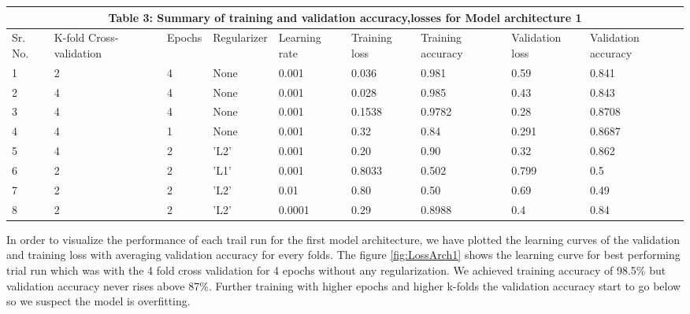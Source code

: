 \documentclass{article}
\begin{document}
\begin{tabular}{ |p{0.5cm}||p{1.4cm}||p{1cm}||p{1.6cm}||p{1.25cm}||p{1.2cm}||p{1.4cm}||p{1.55cm}||p{1.5cm}|}
\hline
 \multicolumn{9}{|c|}{Table 3: Summary of training and validation accuracy,losses for Model architecture 1 } \\
 \hline
 Sr. No. & K-fold Cross-validation & Epochs & Regularizer & Learning rate & Training loss & Training accuracy & Validation loss & Validation accuracy\\
 \hline
 1 & 2  & 4  & None & 0.001 & 0.036 & 0.981 & 0.59 & 0.841 \\
 2 & 4 & 4  & None & 0.001 & 0.028 & 0.985 & 0.43 & 0.843 \\
 3 & 4 & 4 & None & 0.001 & 0.1538 & 0.9782 & 0.28 & 0.8708 \\
 4 & 4 & 1& None & 0.001 & 0.32 & 0.84 & 0.291 & 0.8687 \\
 5 & 4 & 2 & 'L2'& 0.001 & 0.20 & 0.90 & 0.32 & 0.862 \\
 6 & 2 & 2 & 'L1'& 0.001 & 0.8033 & 0.502 & 0.799 & 0.5 \\
 7 & 2 & 2 & 'L2'& 0.01 & 0.80 & 0.50 & 0.69 & 0.49\\
 8 & 2 & 2 & 'L2'& 0.0001 & 0.29 & 0.8988 & 0.4 & 0.84\\
 \hline
\end{tabular}\newline
\newline
\newline In order to visualize the performance of each trail run for the first model architecture, we have plotted the learning curves of the validation and training loss with averaging validation accuracy for every folds. The figure \ref{fig:LossArch1} shows the learning curve for best performing trial run which was with the 4 fold cross validation for 4 epochs without any regularization. We achieved training accuracy of 98.5\% but validation accuracy never rises above 87\%. Further training with higher epochs and higher k-folds the validation accuracy start to go below so we suspect the model is overfitting.
\end{document}
